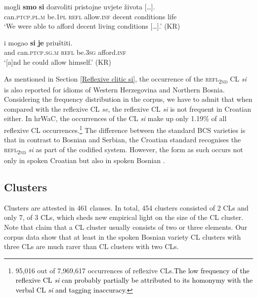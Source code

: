 \begin{exe}\ex\label{(9.19)}
\gll  [\dots] mogli  \textbf{smo}  \textbf{si}  dozvoliti  pristojne  uvjete  {života  [\dots].}  \\
{} can.\textsc{ptcp}.\textsc{pl.m} be.1\textsc{pl}  \textsc{refl}  allow.\textsc{inf}  decent conditions life \\
\glt ‘We were able to afford decent living conditions  [\dots].’
\hfill (KR)

\ex\label{(9.20)}
\gll  [\dots] i mogao  \textbf{si}  \textbf{je}  priuštiti.  \\
{} and can.\textsc{ptcp}.\textsc{sg}.\textsc{m}  \textsc{refl}  be.3\textsc{sg}  afford.\textsc{inf} \\
\glt ‘[a]nd he could allow himself.’
\hfill (KR)
\end{exe}

\noindent As mentioned in Section \ref{Reflexive clitic si}, the occurrence of the \textsc{refl\textsubscript{2nd}} CL \textit{si} is also reported for idioms of Western Herzegovina and Northern Bosnia. Considering the frequency distribution in the corpus, we have to admit that when compared with the reflexive CL \textit{se}, the reflexive CL \textit{si} is not frequent in Croatian either. In hrWaC, the occurrences of the CL \textit{si} make up only 1.19\% of all reflexive CL occurrences.\footnote{95,016 out of 7,969,617 occurrences of reflexive CLs.\textcolor{black}{The low frequency of the reflexive CL \textit{si} can probably partially be attributed to its homonymy with the verbal CL \textit{si} and tagging inaccuracy.}} The difference between the standard BCS varieties is that in contrast to Bosnian and Serbian, the Croatian standard recognises the \textsc{refl\textsubscript{2nd}} \textit{si} as part of the codified system. However, the form as such occurs not only in spoken Croatian but also in spoken Bosnian \citep[pace][440]{Ridjanovic12}. 

\subsection{Clusters}

Clusters are attested in 461 clauses. In total, 454 clusters consisted of 2 CLs and only 7, of 3 CLs, which sheds new empirical light on the size of the CL cluster. Note that \citet[451f]{PiperKlajn14} claim that a CL cluster usually consists of two or three elements. Our corpus data show that at least in the spoken Bosnian variety CL clusters with three CLs are much rarer than CL clusters with two CLs. 

